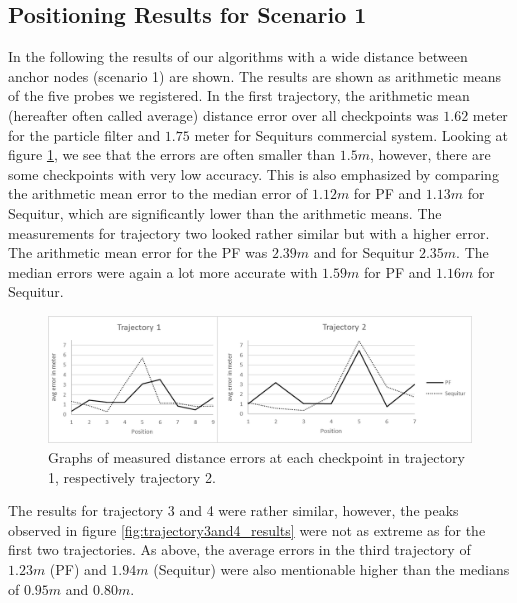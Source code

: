 \subsection{Positioning Results for Scenario 1}
In the following the results of our algorithms with a wide distance between anchor nodes (scenario 1) are shown. The results are shown as arithmetic means of the five probes we registered. In the first trajectory, the arithmetic mean (hereafter often called average) distance error over all checkpoints was $1.62$ meter for the particle filter and $1.75$ meter for Sequiturs commercial system. Looking at figure \ref{fig:trajectory1and2_results}, we see that the errors are often smaller than $1.5m$, however, there are some checkpoints with very low accuracy. This is also emphasized by comparing the arithmetic mean error to the median error of $1.12m$ for PF and $1.13m$ for Sequitur, which are significantly lower than the arithmetic means. The measurements for trajectory two looked rather similar but with a higher error. The arithmetic mean error for the PF was $2.39m$ and for Sequitur $2.35m$. The median errors were again a lot more accurate with $1.59m$ for PF and $1.16m$ for Sequitur.
\begin{figure}[th]
\centering
\includegraphics[width=1.0\textwidth]{Figures/trajectory1_2_results}
\decoRule
\caption[Positioning Results Trajectory 1 and 2]{Graphs of measured distance errors at each checkpoint in trajectory 1, respectively trajectory 2.}
\label{fig:trajectory1and2_results}
\end{figure}
The results for trajectory 3 and 4 were rather similar, however, the peaks observed in figure \ref{fig:trajectory3and4_results} were not as extreme as for the first two trajectories. As above, the average errors in the third trajectory of $1.23m$ (PF) and $1.94m$ (Sequitur) were also mentionable higher than the medians of $0.95m$ and $0.80m$.
